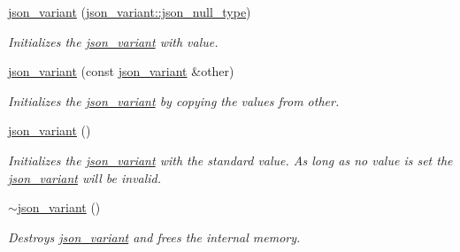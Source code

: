 \begin{DoxyCompactItemize}
\hyperlink{classJSONLIB__NAMESPACE_1_1json__variant_a629877f8e133d0731ad96cf2972dd244}{json\+\_\+variant} (\hyperlink{classJSONLIB__NAMESPACE_1_1json__variant_a1251d2c28258eeebea991ed0b39c3e0c}{json\+\_\+variant\+::json\+\_\+null\+\_\+type})
\begin{DoxyCompactList}\small\item\em Initializes the \hyperlink{classJSONLIB__NAMESPACE_1_1json__variant}{json\+\_\+variant} with {\ttfamily value}. \end{DoxyCompactList}\item 
\mbox{\label{classJSONLIB__NAMESPACE_1_1json__variant_a37e47ee2b0ede098f9dc7194444e87e2}} 
\hyperlink{classJSONLIB__NAMESPACE_1_1json__variant_a37e47ee2b0ede098f9dc7194444e87e2}{json\+\_\+variant} (const \hyperlink{classJSONLIB__NAMESPACE_1_1json__variant}{json\+\_\+variant} \&other)
\begin{DoxyCompactList}\small\item\em Initializes the \hyperlink{classJSONLIB__NAMESPACE_1_1json__variant}{json\+\_\+variant} by copying the values from {\ttfamily other}. \end{DoxyCompactList}\item 
\hyperlink{classJSONLIB__NAMESPACE_1_1json__variant_a846c20ca7916959fcf8768f6c5bac36d}{json\+\_\+variant} ()
\begin{DoxyCompactList}\small\item\em Initializes the \hyperlink{classJSONLIB__NAMESPACE_1_1json__variant}{json\+\_\+variant} with the standard value. As long as no value is set the \hyperlink{classJSONLIB__NAMESPACE_1_1json__variant}{json\+\_\+variant} will be invalid. \end{DoxyCompactList}\item 
\mbox{\label{classJSONLIB__NAMESPACE_1_1json__variant_acdc3fa9fc5613701852f467e695c7e10}} 
\hyperlink{classJSONLIB__NAMESPACE_1_1json__variant_acdc3fa9fc5613701852f467e695c7e10}{$\sim$json\+\_\+variant} ()
\begin{DoxyCompactList}\small\item\em Destroys \hyperlink{classJSONLIB__NAMESPACE_1_1json__variant}{json\+\_\+variant} and frees the internal memory. \end{DoxyCompactList}\item 
\mbox{\label{classJSONLIB__NAMESPACE_1_1json__variant_a0cfce194bda4d31ad37d765a6428974a}} 

\end{DoxyCompactItemize}
